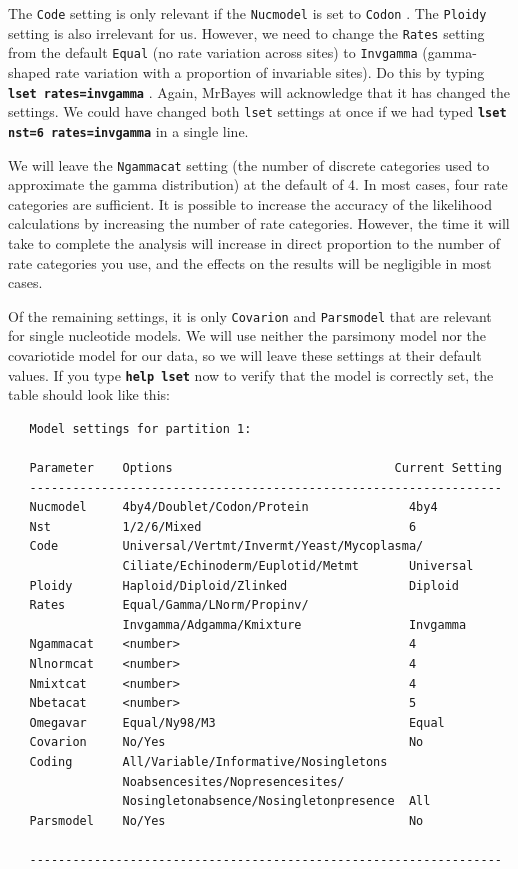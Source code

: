 \documentclass[12pt]{book}
\newcommand{\ttt}[1]{\texttt{#1} }
\newcommand{\tb}[1]{\ttt{\textbf{#1}} }
\begin{document}
The \ttt{Code} setting is only relevant if the \ttt{Nucmodel} is set to \ttt{Codon}.  The
\ttt{Ploidy} setting is also irrelevant for us. However, we need to change the \ttt{Rates}
setting from the default \ttt{Equal} (no rate variation across sites) to \ttt{Invgamma}
(gamma-shaped rate variation with a proportion of invariable sites). Do this by typing \tb{lset
rates=invgamma}. Again, MrBayes will acknowledge that it has changed the settings. We could have
changed both \ttt{lset} settings at once if we had typed \tb{lset nst=6 rates=invgamma} in a
single line.

We will leave the \ttt{Ngammacat} setting (the number of discrete categories used to approximate
the gamma distribution) at the default of 4. In most cases, four rate categories are sufficient. It
is possible to increase the accuracy of the likelihood calculations by increasing the number of
rate categories. However, the time it will take to complete the analysis will increase in direct
proportion to the number of rate categories you use, and the effects on the results will be
negligible in most cases.

Of the remaining settings, it is only \ttt{Covarion} and \ttt{Parsmodel} that are relevant
for single nucleotide models. We will use neither the parsimony model nor the covariotide model for
our data, so we will leave these settings at their default values. If you type \tb{help lset}
now to verify that the model is correctly set, the table should look like this:

\begin{singlespacing}
\small
\begin{verbatim}
   Model settings for partition 1:

   Parameter    Options                               Current Setting
   ------------------------------------------------------------------
   Nucmodel     4by4/Doublet/Codon/Protein              4by4
   Nst          1/2/6/Mixed                             6
   Code         Universal/Vertmt/Invermt/Yeast/Mycoplasma/
                Ciliate/Echinoderm/Euplotid/Metmt       Universal
   Ploidy       Haploid/Diploid/Zlinked                 Diploid
   Rates        Equal/Gamma/LNorm/Propinv/
                Invgamma/Adgamma/Kmixture               Invgamma
   Ngammacat    <number>                                4
   Nlnormcat    <number>                                4
   Nmixtcat     <number>                                4
   Nbetacat     <number>                                5
   Omegavar     Equal/Ny98/M3                           Equal
   Covarion     No/Yes                                  No
   Coding       All/Variable/Informative/Nosingletons
                Noabsencesites/Nopresencesites/
                Nosingletonabsence/Nosingletonpresence  All
   Parsmodel    No/Yes                                  No

   ------------------------------------------------------------------
\end{verbatim}
\normalsize
\end{singlespacing}
\end{document}
